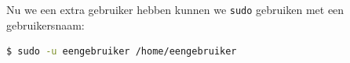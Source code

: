 Nu we een extra gebruiker hebben kunnen we \texttt{sudo} gebruiken met een gebruikersnaam:
\begin{lstlisting}[language=bash]
$ sudo -u eengebruiker /home/eengebruiker
\end{lstlisting}

